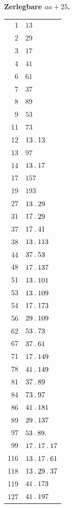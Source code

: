 %
\par{}
\begin{center}\textbf{Zerlegbare $aa+25$.}\end{center}
\begingroup\small\setlength{\tabcolsep}{5pt}
\begin{longtable}{@{}r|l@{}}
1 & $13$\\
2 & $29$\\
3 & $17$\\
4 & $41$\\
6 & $61$\\
7 & $37$\\
8 & $89$\\
9 & $53$\\
11 & $73$\\
12 & $13\mathbin{.} 13$\\
13 & $97$\\
14 & $13\mathbin{.} 17$\\
17 & $157$\\
19 & $193$\\
27 & $13\mathbin{.} 29$\\
31 & $17\mathbin{.} 29$\\
37 & $17\mathbin{.} 41$\\
38 & $13\mathbin{.} 113$\\
44 & $37\mathbin{.} 53$\\
48 & $17\mathbin{.} 137$\\
51 & $13\mathbin{.} 101$\\
53 & $13\mathbin{.} 109$\\
54 & $17\mathbin{.} 173$\\
56 & $29\mathbin{.} 109$\\
62 & $53\mathbin{.} 73$\\
67 & $37\mathbin{.} 61$\\
71 & $17\mathbin{.} 149$\\
78 & $41\mathbin{.} 149$\\
81 & $37\mathbin{.} 89$\\
84 & $73\mathbin{.} 97$\\
86 & $41\mathbin{.} 181$\\
89 & $29\mathbin{.} 137$\\
97 & $53\mathbin{.} 89\mathbin{.} $\\
99 & $17\mathbin{.} 17\mathbin{.} 17$\\
116 & $13\mathbin{.} 17\mathbin{.} 61$\\
118 & $13\mathbin{.} 29\mathbin{.} 37$\\
119 & $41\mathbin{.} 173$\\
127 & $41\mathbin{.} 197$\\

\end{longtable}
